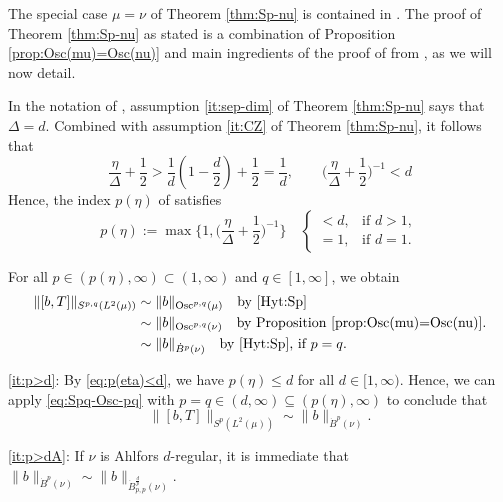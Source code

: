 \documentclass[reqno]{amsart}
\newcommand{\Norm}[2]{\|#1\|_{#2}}
\theoremstyle{plain}
\theoremstyle{definition}
\theoremstyle{remark}
\begin{document}
The special case $\mu=\nu$ of Theorem \ref{thm:Sp-nu} is contained in \cite[Theorem 1.1]{Hyt:Sp}. The proof of Theorem \ref{thm:Sp-nu} as stated is a combination of Proposition \ref{prop:Osc(mu)=Osc(nu)} and main ingredients of the proof of \cite[Theorem 1.1]{Hyt:Sp} from \cite{Hyt:Sp,HK:W1p}, as we will now detail.

In the notation of \cite[Theorem 1.1]{Hyt:Sp}, assumption \eqref{it:sep-dim} of Theorem \ref{thm:Sp-nu} says that $\Delta=d$. Combined with assumption \eqref{it:CZ} of Theorem \ref{thm:Sp-nu}, it follows that
\begin{equation*}
  \frac{\eta}{\Delta}+\frac 12>\frac{1}{d}(1-\frac{d}{2}) + \frac12=\frac 1d,\qquad
  \Big(\frac{\eta}{\Delta}+\frac 12\Big)^{-1}<d
\end{equation*}
Hence, the index $p(\eta)$ of \cite[(1.9)]{Hyt:Sp} satisfies
\begin{equation}\label{eq:p(eta)<d}
  p(\eta):=\max\Big\{1,\Big(\frac{\eta}{\Delta}+\frac 12\Big)^{-1}\Big\}
  \quad\begin{cases} <d, & \text{if }d>1, \\ =1, & \text{if }d=1.\end{cases}
\end{equation}

For all $p\in(p(\eta),\infty)\subset(1,\infty)$ and $q\in[1,\infty]$, we obtain
\begin{equation}\label{eq:Spq-Osc-pq}
\begin{split}
  \Norm{[b,T]}{S^{p,q}(L^2(\mu))}
  &\sim\Norm{b}{\operatorname{Osc}^{p,q}(\mu)}\quad\text{by \cite[Proposition 1.26]{Hyt:Sp}} \\
  &\sim\Norm{b}{\operatorname{Osc}^{p,q}(\nu)}\quad\text{by Proposition \ref{prop:Osc(mu)=Osc(nu)}}.  \\
  &\sim\Norm{b}{\dot B^p(\nu)}\quad\text{by \cite[Proposition 11.5]{Hyt:Sp}, if }p=q.
\end{split}
\end{equation}

\eqref{it:p>d}: By \eqref{eq:p(eta)<d}, we have $p(\eta)\leq d$ for all $d\in[1,\infty)$.
Hence, we can apply \eqref{eq:Spq-Osc-pq} with $p=q\in(d,\infty)\subseteq(p(\eta),\infty)$ to conclude that
\begin{equation*}
  \Norm{[b,T]}{S^{p}(L^2(\mu))}
  \sim\Norm{b}{\dot B^p(\nu)}.
\end{equation*}

\eqref{it:p>dA}: 
If $\nu$ is Ahlfors $d$-regular, it is immediate that
  $\Norm{b}{\dot B^p(\nu)}\sim\Norm{b}{\dot B^{\frac{d}{p}}_{p,p}(\nu)}.$
\end{document}
